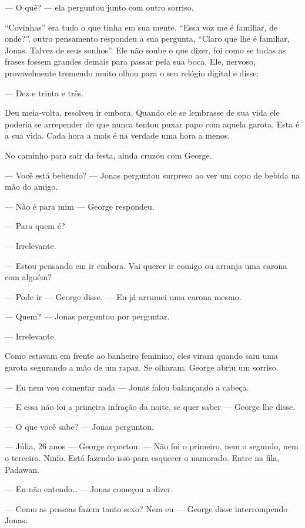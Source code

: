 --- O quê? --- ela perguntou\mudanca{,} junto com outro sorriso.

``Covinhas'' era tudo o que tinha em sua mente. ``Essa voz me é familiar, de onde?''.  outro pensamento respondeu a sua pergunta, ``Claro que lhe é familiar, Jonas. Talvez de seus sonhos''. Ele não soube o que dizer, foi como se todas as frases fossem grandes demais para passar pela sua boca. Ele, nervoso, provavelmente tremendo muito olhou para o seu relógio digital e disse:

--- Dez e trinta e três.

Deu meia-volta, resolveu ir embora. Quando ele se lembrasse de sua vida ele poderia se arrepender de que nunca tentou puxar papo com aquela garota. Esta é a sua vida. Cada hora a mais é na verdade uma hora a menos.

No caminho para sair da festa, ainda cruzou com George.

--- Você está bebendo? --- Jonas perguntou surpreso ao ver um copo de bebida na mão do amigo.

--- Não é para mim --- George respondeu.

--- Para quem é?

--- Irrelevante.

--- Estou pensando em ir embora. Vai querer ir comigo ou arranja uma carona com alguém?

--- Pode ir --- George disse. --- Eu já arrumei uma carona mesmo.

--- Quem? --- Jonas perguntou por perguntar.

--- Irrelevante.

Como estavam em frente ao banheiro feminino, eles viram quando saiu uma garota segurando a mão de um rapaz. Se olharam. George abriu um sorriso.

--- Eu nem vou comentar nada --- Jonas falou balançando a cabeça.

--- E essa não foi a primeira infração da noite, se quer saber --- George lhe disse.

--- O que você sabe? --- Jonas perguntou.

--- Júlia, 26 anos --- George reportou. --- Não foi o primeiro, nem o segundo, nem o terceiro. Ninfo. Está fazendo isso para esquecer o namorado. Entre na fila, Padawan.

--- Eu não entendo\ldots\,--- Jonas começou a dizer.

--- Como as pessoas fazem tanto sexo? Nem eu --- George disse interrompendo Jonas.

